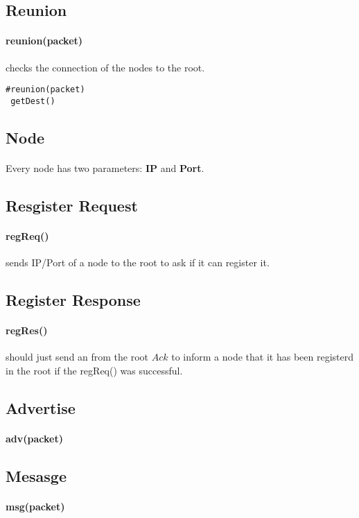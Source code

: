 \documentclass{article}
\begin{document}
\subsection{Reunion}
\paragraph{reunion(packet)} checks the connection of the nodes to the root.
\begin{lstlisting}
#reunion(packet)
 getDest()
\end{lstlisting}
\subsection{Node}
\paragraph{}Every node has two parameters: \textbf{IP} and \textbf{Port}.
\subsection{Resgister Request}
\paragraph{regReq()} sends IP/Port of a node to the root to ask if it can register it. 
\subsection{Register Response}
\paragraph{regRes()} should just send an from the root $Ack$ to inform a node that it has been registerd in the root if the regReq() was successful.
\subsection{Advertise}
\paragraph{adv(packet)}
\subsection{Mesasge}
\paragraph{msg(packet)}
\clearpage
\end{document}
